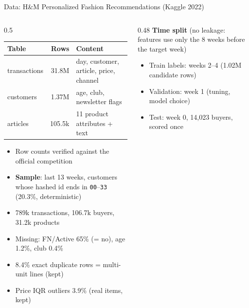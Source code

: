 \documentclass[aspectratio=169,10pt]{beamer}
\begin{document}
\begin{frame}{Data: H\&M Personalized Fashion Recommendations (Kaggle 2022)}
\begin{columns}[T]
\begin{column}{0.5\textwidth}
\scriptsize
\begin{tabular}{lrl}
\toprule
Table & Rows & Content\\
\midrule
transactions & 31.8M & day, customer, article, price, channel\\
customers & 1.37M & age, club, newsletter flags\\
articles & 105.5k & 11 product attributes + text\\
\bottomrule
\end{tabular}
\small
\vspace{6pt}
\begin{itemize}
\item Row counts verified against the official competition
\item \textbf{Sample}: last 13 weeks, customers whose hashed id ends in \texttt{00}--\texttt{33} (20.3\%, deterministic)
\item 789k transactions, 106.7k buyers, 31.2k products
\item Missing: FN/Active 65\% (= no), age 1.2\%, club 0.4\%
\item 8.4\% exact duplicate rows = multi-unit lines (kept)
\item Price IQR outliers 3.9\% (real items, kept)
\end{itemize}
\end{column}
\begin{column}{0.48\textwidth}
\textbf{Time split} (no leakage: features use only the 8 weeks before the target week)\\[6pt]
\vspace{6pt}
\small
\begin{itemize}
\item Train labels: weeks 2--4 (1.02M candidate rows)
\item Validation: week 1 (tuning, model choice)
\item Test: week 0, 14,023 buyers, scored once
\end{itemize}
\end{column}
\end{columns}
\end{frame}
\end{document}

